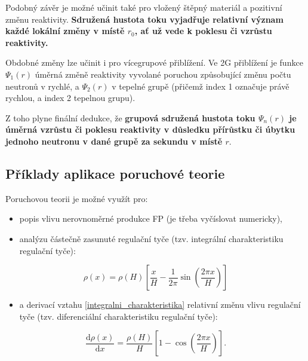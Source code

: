 Podobný závěr je možné učinit také pro vložený štěpný materiál a pozitivní změnu reaktivity. \textbf{Sdružená hustota toku vyjadřuje relativní význam každé lokální změny v místě $r_0$, ať už vede k poklesu či vzrůstu reaktivity.}

Obdobné změny lze učinit i pro vícegrupové přiblížení. Ve 2G přiblížení je funkce $\Psi_1(r)$ úměrná změně reaktivity vyvolané poruchou způsobující změnu počtu neutronů v rychlé, a $\Psi_2(r)$ v tepelné grupě (přičemž index 1 označuje právě rychlou, a index 2 tepelnou grupu).

Z toho plyne finální dedukce, že \textbf{grupová sdružená hustota toku $\Psi_n(r)$ je úměrná vzrůstu či poklesu reaktivity v důsledku přírůstku či úbytku jednoho neutronu v dané grupě za sekundu v místě $r$}.

\subsection{Příklady aplikace poruchové teorie}

Poruchovou teorii je možné využít pro:

\begin{itemize}
  \item popis vlivu nerovnoměrné produkce FP (je třeba vyčíslovat numericky),
  \item analýzu částečně zasunuté regulační tyče (tzv. integrální charakteristiku regulační tyče):
\end{itemize}

\begin{equation}
  \rho(x) = \rho(H) \left [ \dfrac{x}{H} - \dfrac{1}{2 \pi} \sin \left ( \dfrac{2 \pi x}{H} \right ) \right ]
  \label{integralni_charakteristika}
\end{equation}

\begin{itemize}
  \item a derivací vztahu \eqref{integralni_charakteristika} relativní změnu vlivu regulační tyče (tzv. diferenciální charakteristiku regulační tyče):
\end{itemize}

\begin{equation}
  \dfrac{\text{d}\rho(x)}{\text{d}x} = \dfrac{\rho(H)}{H} \left [ 1 - \cos \left ( \dfrac{2 \pi x}{H} \right ) \right ].
  \label{diferencialni_charakteristika}
\end{equation}
